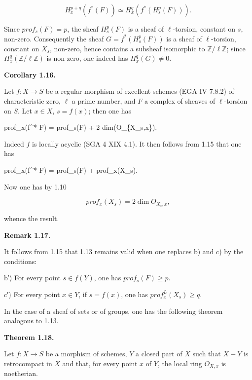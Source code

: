 \documentclass[
  11pt,
  a4paper,
]{book}
\newenvironment{Shaded}{}{}
\newcommand{\NormalTok}[1]{#1}
\begin{document}
\[ H^{p+q}_{x}(f^{*}(F)) \simeq H^{q}_{x}(f^{*}(H^{p}_{s}(F))). \]

Since \(prof_{s}(F) = p\), the sheaf \(H^{p}_{s}(F)\) is a sheaf of
\(\ell\)-torsion, constant on \(s\), non-zero. Consequently the sheaf
\(G = f^{*}(H^{p}_{s}(F))\) is a sheaf of \(\ell\)-torsion, constant on
\(X_{s}\), non-zero, hence contains a subsheaf isomorphic to
\(\mathbb{Z}/\ell \mathbb{Z}\); since
\(H^{q}_{x}(\mathbb{Z}/\ell \mathbb{Z})\) is non-zero, one indeed has
\(H^{q}_{x}(G) \neq 0\).

\textbf{Corollary 1.16.}

Let \(f : X \to S\) be a regular morphism of excellent schemes (EGA IV
7.8.2) of characteristic zero, \(\ell\) a prime number, and \(F\) a
complex of sheaves of \(\ell\)-torsion on \(S\). Let \(x \in X\),
\(s = f(x)\); then one has

\begin{Shaded}
\begin{Highlighting}[]
\NormalTok{prof\_x(f\^{}* F) = prof\_s(F) + 2 dim(O\_\{X\_s,x\}).}
\end{Highlighting}
\end{Shaded}

Indeed \(f\) is locally acyclic (SGA 4 XIX 4.1). It then follows from
1.15 that one has

\begin{Shaded}
\begin{Highlighting}[]
\NormalTok{prof\_x(f\^{}* F) = prof\_s(F) + prof\_x(X\_s).}
\end{Highlighting}
\end{Shaded}

Now one has by 1.10

\[ prof_{x}(X_{s}) = 2 \dim O_{X_{s},x}, \]

whence the result.

\textbf{Remark 1.17.}

It follows from 1.15 that 1.13 remains valid when one replaces b) and c)
by the conditions:

b′) For every point \(s \in f(Y)\), one has \(prof_{s}(F) \geqslant p\).

c′) For every point \(x \in Y\), if \(s = f(x)\), one has
\(prof^{L}_{x}(X_{s}) \geqslant q\).

In the case of a sheaf of sets or of groups, one has the following
theorem analogous to 1.13.

\textbf{Theorem 1.18.}

Let \(f : X \to S\) be a morphism of schemes, \(Y\) a closed part of
\(X\) such that \(X - Y\) is retrocompact in \(X\) and that, for every
point \(x\) of \(Y\), the local ring \(O_{X,x}\) is noetherian.
\end{document}

